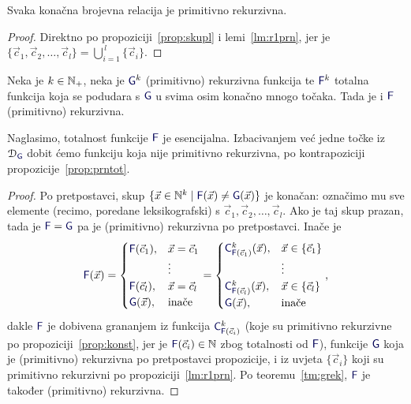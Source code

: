 \begin{korolar}[{name=[primitivna rekurzivnost konačnih relacija]}]\label{kor:konprn}
Svaka konačna brojevna relacija je primitivno rekurzivna.
\end{korolar}
\begin{proof}
Direktno po propoziciji~\ref{prop:skupl} i lemi~\ref{lm:r1prn}, jer je $\{\vec c_1,\vec c_2,\dotsc,\vec c_l\}=\bigcup_{i=1}^{\,l}\{\vec c_i\}$.
\end{proof}

\begin{propozicija}[{name=[{teorem o editiranju za totalne funkcije}]}]\label{prop:konprom}
Neka je $k\in{\mathbb N}_+$, neka je $\f G^k$ (primitivno) rekurzivna funkcija te $\f F^k$ totalna funkcija koja se podudara s $\f G$ u svima osim konačno mnogo točaka. Tada je i $\f F$ (primitivno) rekurzivna.
\end{propozicija}
Naglasimo, totalnost funkcije $\f F$ je esencijalna. Izbacivanjem već jedne točke iz $\dom{\f G}$ dobit ćemo funkciju koja nije primitivno rekurzivna, po kontrapoziciji propozicije~\ref{prop:prntot}.
\begin{proof}
    Po pretpostavci, skup $\{\vec x\in\N^k\mid\f F(\vec x)\ne\f G(\vec x)\}$ je konačan: označimo mu sve elemente (recimo, poredane leksikografski) s $\vec c_1,\vec c_2,\dotsc,\vec c_l$. Ako je taj skup prazan, tada je $\f F=\f G$ pa je (primitivno) rekurzivna po pretpostavci. Inače je
\begin{equation}
    \f F(\vec x)=\begin{cases}
    \f F(\vec c_1),&\vec x=\vec c_1\\
    &\vdots\\
    \f F(\vec c_l),&\vec x=\vec c_l\\
    \f G(\vec x),&\text{inače}
    \end{cases}=\begin{cases}
    \f C^k_{\f F(\vec c_1)}(\vec x),&\vec x\in\{\vec c_1\}\\
    &\vdots\\
    \f C^k_{\f F(\vec c_l)}(\vec x),&\vec x\in\{\vec c_l\}\\
    \f G(\vec x),&\text{inače}
    \end{cases}\text,
\end{equation}
dakle $\f F$ je dobivena grananjem iz funkcija $\f C^k_{\f F(\vec c_i)}$ (koje su primitivno rekurzivne po propoziciji~\ref{prop:konst}, jer je $\f F(\vec c_i)\in\N$ zbog totalnosti od $\f F$), funkcije $\f G$ koja je (primitivno) rekurzivna po pretpostavci propozicije, i iz uvjeta $\{\vec c_i\}$ koji su primitivno rekurzivni po propoziciji~\ref{lm:r1prn}. Po teoremu~\ref{tm:grek}, $\f F$ je također (primitivno) rekurzivna.
\end{proof}


